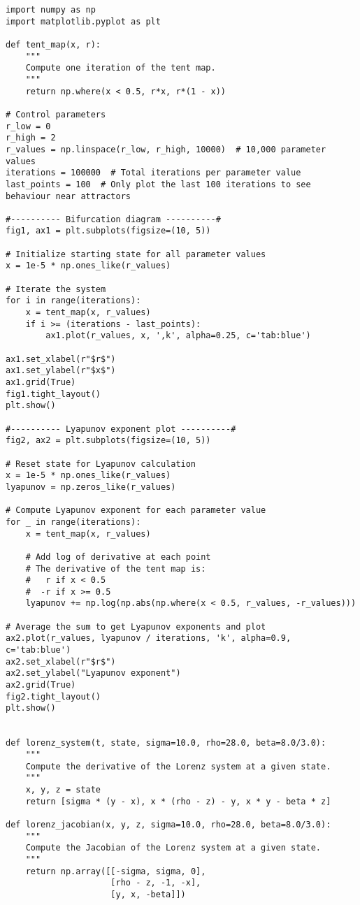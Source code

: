 \begin{lstlisting}[style=python]
import numpy as np
import matplotlib.pyplot as plt

def tent_map(x, r):
    """
    Compute one iteration of the tent map.
    """
    return np.where(x < 0.5, r*x, r*(1 - x))

# Control parameters
r_low = 0
r_high = 2
r_values = np.linspace(r_low, r_high, 10000)  # 10,000 parameter values
iterations = 100000  # Total iterations per parameter value
last_points = 100  # Only plot the last 100 iterations to see behaviour near attractors

#---------- Bifurcation diagram ----------#
fig1, ax1 = plt.subplots(figsize=(10, 5))

# Initialize starting state for all parameter values
x = 1e-5 * np.ones_like(r_values)

# Iterate the system
for i in range(iterations):
    x = tent_map(x, r_values)
    if i >= (iterations - last_points):
        ax1.plot(r_values, x, ',k', alpha=0.25, c='tab:blue')

ax1.set_xlabel(r"$r$") 
ax1.set_ylabel(r"$x$")
ax1.grid(True)
fig1.tight_layout()
plt.show()

#---------- Lyapunov exponent plot ----------#
fig2, ax2 = plt.subplots(figsize=(10, 5))

# Reset state for Lyapunov calculation
x = 1e-5 * np.ones_like(r_values)
lyapunov = np.zeros_like(r_values)

# Compute Lyapunov exponent for each parameter value
for _ in range(iterations):
    x = tent_map(x, r_values)
    
    # Add log of derivative at each point
    # The derivative of the tent map is:
    #   r if x < 0.5
    #  -r if x >= 0.5
    lyapunov += np.log(np.abs(np.where(x < 0.5, r_values, -r_values)))

# Average the sum to get Lyapunov exponents and plot
ax2.plot(r_values, lyapunov / iterations, 'k', alpha=0.9, c='tab:blue')
ax2.set_xlabel(r"$r$")
ax2.set_ylabel("Lyapunov exponent")
ax2.grid(True)
fig2.tight_layout()
plt.show()


def lorenz_system(t, state, sigma=10.0, rho=28.0, beta=8.0/3.0):
    """
    Compute the derivative of the Lorenz system at a given state.
    """
    x, y, z = state
    return [sigma * (y - x), x * (rho - z) - y, x * y - beta * z]

def lorenz_jacobian(x, y, z, sigma=10.0, rho=28.0, beta=8.0/3.0):
    """
    Compute the Jacobian of the Lorenz system at a given state.
    """
    return np.array([[-sigma, sigma, 0],
                     [rho - z, -1, -x],
                     [y, x, -beta]])



\end{lstlisting}
